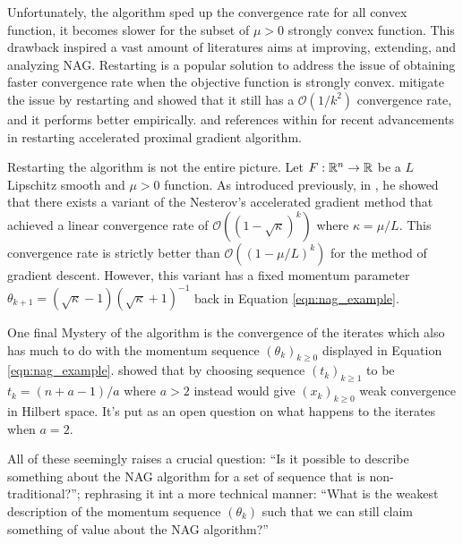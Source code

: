 \documentclass[12pt]{article}
\begin{document}
    Unfortunately, the algorithm sped up the convergence rate for all convex function, it becomes slower for the subset of $\mu > 0$ strongly convex function. 
    This drawback inspired a vast amount of literatures aims at improving, extending, and analyzing NAG. 
    Restarting is a popular solution to address the issue of obtaining faster convergence rate when the objective function is strongly convex. 
     mitigate the issue by restarting and showed that it still has a $\mathcal O(1/k^2)$ convergence rate, and it performs better empirically. 
     and references within for recent advancements in restarting accelerated proximal gradient algorithm.
    \par
    Restarting the algorithm is not the entire picture. 
    Let $F:\mathbb R^n \rightarrow \mathbb R$ be a $L$ Lipschitz smooth and $\mu > 0$ function. 
    As introduced previously, in , he showed that there exists a variant of the Nesterov's accelerated gradient method that achieved a linear convergence rate of $\mathcal O((1 - \sqrt{\kappa})^k)$ where $\kappa = \mu/L$. 
    This convergence rate is strictly better than $\mathcal O((1 - \mu/L)^k)$ for the method of gradient descent. 
    However, this variant has a fixed momentum parameter $\theta_{k + 1} = (\sqrt{\kappa} - 1)(\sqrt{\kappa} + 1)^{-1}$ back in Equation \ref{eqn:nag_example}. 
    \par
    One final Mystery of the algorithm is the convergence of the iterates which also has much to do with the momentum sequence $(\theta_k)_{k\ge 0}$ displayed in Equation \ref{eqn:nag_example}. 
     showed that by choosing sequence $(t_k)_{k \ge 1}$ to be $t_k = (n + a - 1)/a$ where $a > 2$ instead would give $(x_k)_{k \ge 0}$ weak convergence in Hilbert space. 
    It's put as an open question on what happens to the iterates when $a = 2$. 
    \par
    All of these seemingly raises a crucial question: ``Is it possible to describe something about the NAG algorithm for a set of sequence that is non-traditional?''; rephrasing it int a more technical manner: ``What is the weakest description of the momentum sequence $(\theta_k)$ such that we can still claim something of value about the NAG algorithm?''
\end{document}
